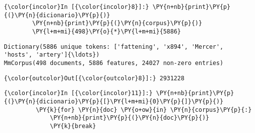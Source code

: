     \begin{Verbatim}[commandchars=\\\{\}]
{\color{incolor}In [{\color{incolor}8}]:} \PY{n+nb}{print}\PY{p}{(}\PY{n}{dicionario}\PY{p}{)}
        \PY{n+nb}{print}\PY{p}{(}\PY{n}{corpus}\PY{p}{)}
        \PY{l+m+mi}{498}\PY{o}{*}\PY{l+m+mi}{5886}
\end{Verbatim}

    \begin{Verbatim}[commandchars=\\\{\}]
Dictionary(5886 unique tokens: ['fattening', 'x894', 'Mercer', 'hosts', 'artery']{\ldots})
MmCorpus(498 documents, 5886 features, 24027 non-zero entries)

    \end{Verbatim}

            \begin{Verbatim}[commandchars=\\\{\}]
{\color{outcolor}Out[{\color{outcolor}8}]:} 2931228
\end{Verbatim}
        
    \begin{Verbatim}[commandchars=\\\{\}]
{\color{incolor}In [{\color{incolor}11}]:} \PY{n+nb}{print}\PY{p}{(}\PY{n}{dicionario}\PY{p}{[}\PY{l+m+mi}{0}\PY{p}{]}\PY{p}{)}
         \PY{k}{for} \PY{n}{doc} \PY{o+ow}{in} \PY{n}{corpus}\PY{p}{:}
             \PY{n+nb}{print}\PY{p}{(}\PY{n}{doc}\PY{p}{)}
             \PY{k}{break}
\end{Verbatim}


